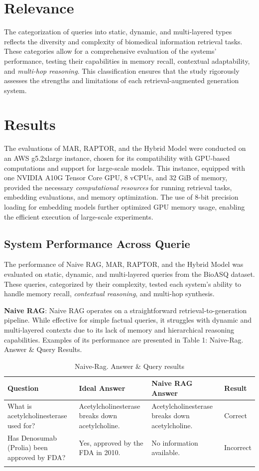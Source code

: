 \documentclass[pdflatex,sn-mathphys-num]{sn-jnl}%
\begin{document}
\section{Relevance}\label{sec4}
The categorization of queries into static, dynamic, and multi-layered types reflects the diversity and complexity of biomedical information retrieval tasks. These categories allow for a comprehensive evaluation of the systems’ performance, testing their capabilities in memory recall, contextual adaptability, and \emph{multi-hop reasoning}. This classification ensures that the study rigorously assesses the strengths and limitations of each retrieval-augmented generation system.


\section{Results}\label{sec5}
The evaluations of MAR, RAPTOR, and the Hybrid Model were conducted on an AWS g5.2xlarge instance, chosen for its compatibility with GPU-based computations and support for large-scale models. This instance, equipped with one NVIDIA A10G Tensor Core GPU, 8 vCPUs, and 32 GiB of memory, provided the necessary \emph{computational resources} for running retrieval tasks, embedding evaluations, and memory optimization. The use of 8-bit precision loading for embedding models further optimized GPU memory usage, enabling the efficient execution of large-scale experiments.

\subsection{System Performance Across Querie}\label{subsec2}
The performance of Naive RAG, MAR, RAPTOR, and the Hybrid Model was evaluated on static, dynamic, and multi-layered queries from the BioASQ dataset. These queries, categorized by their complexity, tested each system’s ability to handle memory recall, \emph{contextual reasoning}, and multi-hop synthesis.

\textbf{Naive RAG}: Naive RAG operates on a straightforward retrieval-to-generation pipeline. While effective for simple factual queries, it struggles with dynamic and multi-layered contexts due to its lack of memory and hierarchical reasoning capabilities. Examples of its performance are presented in Table 1: Naive-Rag. Answer \& Query Results.
\begin{table}[h]
\caption{Naive-Rag. Answer \& Query results}\label{tab:naive_rag_results}%
\begin{tabular}{@{}p{}p{}p{}p{}@{}}
\toprule
\textbf{Question} & \textbf{Ideal Answer} & \textbf{Naive RAG Answer} & \textbf{Result} \\
\midrule
What is acetylcholinesterase used for? & Acetylcholinesterase breaks down acetylcholine. & Acetylcholinesterase breaks down acetylcholine. &  Correct \\
Has Denosumab (Prolia) been approved by FDA? & Yes, approved by the FDA in 2010. & No information available. & Incorrect \\
\botrule
\end{tabular}
\end{table}
\end{document}
